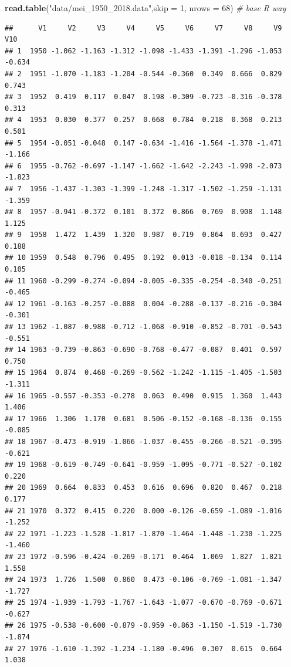 \documentclass[]{article}
\newenvironment{Shaded}{\begin{snugshade}}{\end{snugshade}}
\newcommand{\CommentTok}[1]{\textcolor[rgb]{0.56,0.35,0.01}{\textit{#1}}}
\newcommand{\DataTypeTok}[1]{\textcolor[rgb]{0.13,0.29,0.53}{#1}}
\newcommand{\DecValTok}[1]{\textcolor[rgb]{0.00,0.00,0.81}{#1}}
\newcommand{\KeywordTok}[1]{\textcolor[rgb]{0.13,0.29,0.53}{\textbf{#1}}}
\newcommand{\NormalTok}[1]{#1}
\newcommand{\StringTok}[1]{\textcolor[rgb]{0.31,0.60,0.02}{#1}}
\begin{document}
\begin{Shaded}
\begin{Highlighting}[]
\KeywordTok{read.table}\NormalTok{(}\StringTok{"data/mei_1950_2018.data"}\NormalTok{,}\DataTypeTok{skip =} \DecValTok{1}\NormalTok{, }\DataTypeTok{nrows =} \DecValTok{68}\NormalTok{) }\CommentTok{# base R way}
\end{Highlighting}
\end{Shaded}

\begin{verbatim}
##      V1     V2     V3     V4     V5     V6     V7     V8     V9    V10
## 1  1950 -1.062 -1.163 -1.312 -1.098 -1.433 -1.391 -1.296 -1.053 -0.634
## 2  1951 -1.070 -1.183 -1.204 -0.544 -0.360  0.349  0.666  0.829  0.743
## 3  1952  0.419  0.117  0.047  0.198 -0.309 -0.723 -0.316 -0.378  0.313
## 4  1953  0.030  0.377  0.257  0.668  0.784  0.218  0.368  0.213  0.501
## 5  1954 -0.051 -0.048  0.147 -0.634 -1.416 -1.564 -1.378 -1.471 -1.166
## 6  1955 -0.762 -0.697 -1.147 -1.662 -1.642 -2.243 -1.998 -2.073 -1.823
## 7  1956 -1.437 -1.303 -1.399 -1.248 -1.317 -1.502 -1.259 -1.131 -1.359
## 8  1957 -0.941 -0.372  0.101  0.372  0.866  0.769  0.908  1.148  1.125
## 9  1958  1.472  1.439  1.320  0.987  0.719  0.864  0.693  0.427  0.188
## 10 1959  0.548  0.796  0.495  0.192  0.013 -0.018 -0.134  0.114  0.105
## 11 1960 -0.299 -0.274 -0.094 -0.005 -0.335 -0.254 -0.340 -0.251 -0.465
## 12 1961 -0.163 -0.257 -0.088  0.004 -0.288 -0.137 -0.216 -0.304 -0.301
## 13 1962 -1.087 -0.988 -0.712 -1.068 -0.910 -0.852 -0.701 -0.543 -0.551
## 14 1963 -0.739 -0.863 -0.690 -0.768 -0.477 -0.087  0.401  0.597  0.750
## 15 1964  0.874  0.468 -0.269 -0.562 -1.242 -1.115 -1.405 -1.503 -1.311
## 16 1965 -0.557 -0.353 -0.278  0.063  0.490  0.915  1.360  1.443  1.406
## 17 1966  1.306  1.170  0.681  0.506 -0.152 -0.168 -0.136  0.155 -0.085
## 18 1967 -0.473 -0.919 -1.066 -1.037 -0.455 -0.266 -0.521 -0.395 -0.621
## 19 1968 -0.619 -0.749 -0.641 -0.959 -1.095 -0.771 -0.527 -0.102  0.220
## 20 1969  0.664  0.833  0.453  0.616  0.696  0.820  0.467  0.218  0.177
## 21 1970  0.372  0.415  0.220  0.000 -0.126 -0.659 -1.089 -1.016 -1.252
## 22 1971 -1.223 -1.528 -1.817 -1.870 -1.464 -1.448 -1.230 -1.225 -1.460
## 23 1972 -0.596 -0.424 -0.269 -0.171  0.464  1.069  1.827  1.821  1.558
## 24 1973  1.726  1.500  0.860  0.473 -0.106 -0.769 -1.081 -1.347 -1.727
## 25 1974 -1.939 -1.793 -1.767 -1.643 -1.077 -0.670 -0.769 -0.671 -0.627
## 26 1975 -0.538 -0.600 -0.879 -0.959 -0.863 -1.150 -1.519 -1.730 -1.874
## 27 1976 -1.610 -1.392 -1.234 -1.180 -0.496  0.307  0.615  0.664  1.038

\end{verbatim}
\end{document}
